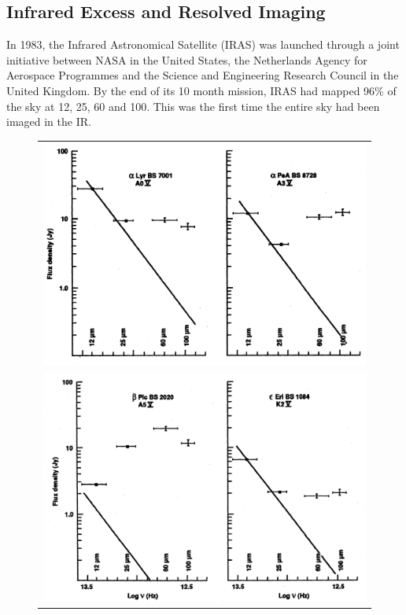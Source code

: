    \subsection{Infrared Excess and Resolved Imaging}\label{sec:excess_resolvedimaging}

    In 1983, the Infrared Astronomical Satellite (IRAS) was launched through a joint initiative between NASA in the United States, the Netherlands Agency for Aerospace Programmes and the Science and Engineering Research Council in the United Kingdom. By the end of its 10 month mission, IRAS had mapped 96\% of the sky at 12, 25, 60 and 100\micron. This was the first time the entire sky had been imaged in the IR. 
    
    \begin{figure}
    \centering
    \begin{tabular}{c}
    \includegraphics[width=.6\textwidth]{Ch1/backman_parsece_1993_IRExcesses_1}  \\
     \includegraphics[width=.6\textwidth]{Ch1/backman_parsece_1993_IRExcesses_2}
    \end{tabular}
    \caption[]{}
    \label{fig:fab_four}
    \end{figure}
    
